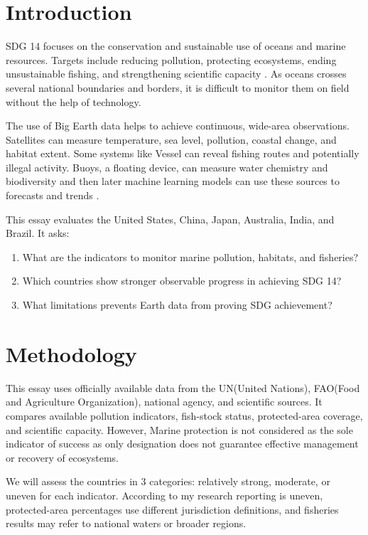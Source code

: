 \documentclass[12pt,letterpaper]{article}
\begin{document}
\section{Introduction}
\label{sec:introduction}
SDG 14 focuses on the conservation and sustainable use of oceans and marine resources. Targets include reducing pollution, protecting ecosystems, ending unsustainable fishing, and strengthening scientific capacity
\parencite{un2015}. As oceans crosses several national boundaries and borders, it is difficult to monitor them on field without the help of technology.

The use of Big Earth data helps to achieve continuous, wide-area observations. Satellites can measure temperature, sea level, pollution, coastal change, and habitat extent. Some systems like Vessel can reveal fishing routes and potentially illegal activity. Buoys, a floating device, can measure water chemistry and biodiversity and then later machine learning models can use these sources to forecasts and trends \parencite{jpl2024}.

This essay evaluates the United States, China, Japan, Australia, India, and Brazil. 
It asks:
\begin{enumerate}
\item What are the indicators to monitor marine pollution, habitats, and fisheries?
\item Which countries show stronger observable progress in achieving SDG 14?
\item What limitations prevents Earth data from proving SDG achievement?
\end{enumerate}

\section{Methodology}
\label{sec:methodology}
This essay uses officially available data from the UN(United Nations), FAO(Food and Agriculture Organization), national agency, and scientific sources. It compares available pollution indicators, fish-stock status, protected-area coverage, and scientific capacity. However, Marine protection is not considered as the sole
indicator of success as only designation does not guarantee effective management or recovery of ecosystems.

We will assess the countries in 3 categories: relatively strong, moderate, or uneven for each indicator. According to my research reporting is uneven, protected-area percentages use different jurisdiction definitions, and fisheries results may refer to national waters or broader regions.
\end{document}
